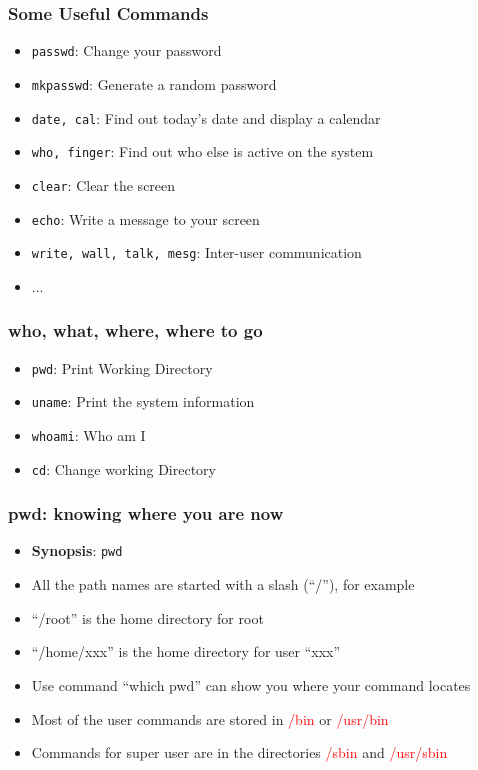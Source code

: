 \documentclass[red]{beamer}
\begin{document}
\begin{CJK*}{UTF8}{gbsn}
\begin{frame}
\frametitle{Some Useful Commands}
\begin{itemize}
    \item \lstinline{passwd}: Change your password
    \item \lstinline{mkpasswd}: Generate a random password
    \item \lstinline{date, cal}: Find out today's date and display a calendar
    \item \lstinline{who, finger}: Find out who else is active on the system
    \item \lstinline{clear}: Clear the screen
    \item \lstinline{echo}: Write a message to your screen
    \item \lstinline{write, wall, talk, mesg}: Inter-user communication
    \item ...
\end{itemize}
\end{frame}

\begin{frame}
\frametitle{who, what, where, where to go}
\begin{itemize}
    \item \lstinline{pwd}: Print Working Directory
    \item \lstinline{uname}: Print the system information
    \item \lstinline{whoami}: Who am I
    \item \lstinline{cd}: Change working Directory
\end{itemize}
\end{frame}

\begin{frame}
\frametitle{pwd: knowing where you are now}
\begin{itemize}
    \item \textbf{Synopsis}: \lstinline{pwd}
    \item All the path names are started with a slash (``/''), for example
    \item ``/root'' is the home directory for root
    \item ``/home/xxx'' is the home directory for user ``xxx''
    \item Use command ``which pwd'' can show you where your command locates
    \item Most of the user commands are stored in \textcolor{red}{/bin} or \textcolor{red}{/usr/bin}
    \item Commands for super user are in the directories \textcolor{red}{/sbin} and \textcolor{red}{/usr/sbin}
\end{itemize}
\end{frame}


\end{CJK*}
\end{document}
